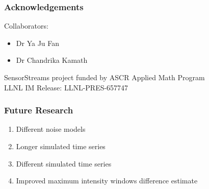\documentclass{beamer}
\begin{document}
\begin{frame}
\begin{center}
\frametitle{Acknowledgements}

Collaborators:

\begin{itemize}

\item Dr Ya Ju Fan

\item Dr Chandrika Kamath

\end{itemize}

$ $\\

SensorStreams project funded by ASCR Applied Math Program\\

$ $\\

LLNL IM Release: LLNL-PRES-657747

\end{center}
\end{frame}


\begin{frame}
\begin{center}
\frametitle{Future Research}

\begin{enumerate}

\item Different noise models

\item Longer simulated time series

\item Different simulated time series

\item Improved maximum intensity windows difference estimate

\end{enumerate}

\end{center}
\end{frame}

\section{}

\begin{frame}
\titlepage %
\end{frame}
\end{document}
